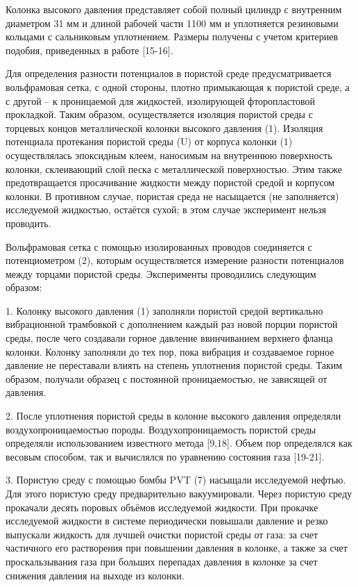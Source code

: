 \begin{multicols}{2}
Колонка высокого давления представляет собой полный цилиндр с внутренним
диаметром 31 мм и длиной рабочей части 1100 мм и уплотняется резиновыми
кольцами с сальниковым уплотнением. Размеры получены с учетом критериев
подобия, приведенных в работе {[}15-16{]}.

Для определения разности потенциалов в пористой среде предусматривается
вольфрамовая сетка, с одной стороны, плотно примыкающая к пористой
среде, а с другой -- к проницаемой для жидкостей, изолирующей
фторопластовой прокладкой. Таким образом, осуществляется изоляция
пористой среды с торцевых концов металлической колонки высокого давления
(1). Изоляция потенциала протекания пористой среды (U) от корпуса
колонки (1) осуществлялась эпоксидным клеем, наносимым на внутреннюю
поверхность колонки, склеивающий слой песка с металлической
поверхностью. Этим также предотвращается просачивание жидкости между
пористой средой и корпусом колонки. В противном случае, пористая среда
не насыщается (не заполняется) исследуемой жидкостью, остаётся сухой; в
этом случае эксперимент нельзя проводить.

Вольфрамовая сетка с помощью изолированных проводов соединяется с
потенциометром (2), которым осуществляется измерение разности
потенциалов между торцами пористой среды. Эксперименты проводились
следующим образом:

1. Колонку высокого давления (1) заполняли пористой средой вертикально
вибрационной трамбовкой с дополнением каждый раз новой порции пористой
среды, после чего создавали горное давление ввинчиванием верхнего фланца
колонки. Колонку заполняли до тех пор, пока вибрация и создаваемое
горное давление не переставали влиять на степень уплотнения пористой
среды. Таким образом, получали образец с постоянной проницаемостью, не
зависящей от давления.

2. После уплотнения пористой среды в колонне высокого давления
определяли воздухопроницаемостью породы. Воздухопроницаемость пористой
среды определяли использованием известного метода {[}9,18{]}. Объем пор
определялся как весовым способом, так и вычислялся по уравнению
состояния газа {[}19-21{]}.

3. Пористую среду с помощью бомбы PVT (7) насыщали исследуемой нефтью.
Для этого пористую среду предварительно вакуумировали. Через пористую
среду прокачали десять поровых объёмов исследуемой жидкости. При
прокачке исследуемой жидкости в системе периодически повышали давление и
резко выпускали жидкость для лучшей очистки пористой среды от газа: за
счет частичного его растворения при повышении давления в колонке, а
также за счет проскальзывания газа при больших перепадах давления в
колонке за счет снижения давления на выходе из колонки.


\end{multicols}
